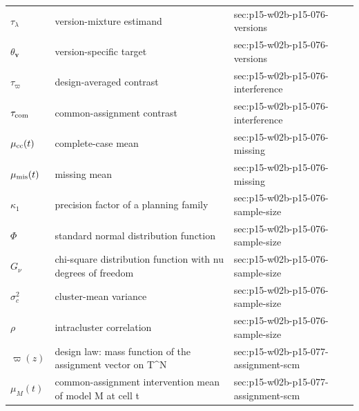 \begin{longtable}{@{}p{}p{}p{}@{}}
\(\tau_\lambda\) & version-mixture estimand & sec:\allowbreak{}p15-\allowbreak{}w02b-\allowbreak{}p15-\allowbreak{}076-\allowbreak{}versions \\
\(\theta_{\mathbf v}\) & version-specific target & sec:\allowbreak{}p15-\allowbreak{}w02b-\allowbreak{}p15-\allowbreak{}076-\allowbreak{}versions \\
\(\tau_\varpi\) & design-averaged contrast & sec:\allowbreak{}p15-\allowbreak{}w02b-\allowbreak{}p15-\allowbreak{}076-\allowbreak{}interference \\
\(\tau_{\rm com}\) & common-assignment contrast & sec:\allowbreak{}p15-\allowbreak{}w02b-\allowbreak{}p15-\allowbreak{}076-\allowbreak{}interference \\
\(\mu_{\rm cc}(t)\) & complete-case mean & sec:\allowbreak{}p15-\allowbreak{}w02b-\allowbreak{}p15-\allowbreak{}076-\allowbreak{}missing \\
\(\mu_{\rm mis}(t)\) & missing mean & sec:\allowbreak{}p15-\allowbreak{}w02b-\allowbreak{}p15-\allowbreak{}076-\allowbreak{}missing \\
\(\kappa_1\) & precision factor of a planning family & sec:\allowbreak{}p15-\allowbreak{}w02b-\allowbreak{}p15-\allowbreak{}076-\allowbreak{}sample-\allowbreak{}size \\
\(\Phi\) & standard normal distribution function & sec:\allowbreak{}p15-\allowbreak{}w02b-\allowbreak{}p15-\allowbreak{}076-\allowbreak{}sample-\allowbreak{}size \\
\(G_\nu\) & chi-square distribution function with nu degrees of freedom & sec:\allowbreak{}p15-\allowbreak{}w02b-\allowbreak{}p15-\allowbreak{}076-\allowbreak{}sample-\allowbreak{}size \\
\(\sigma_c^2\) & cluster-mean variance & sec:\allowbreak{}p15-\allowbreak{}w02b-\allowbreak{}p15-\allowbreak{}076-\allowbreak{}sample-\allowbreak{}size \\
\(\rho\) & intracluster correlation & sec:\allowbreak{}p15-\allowbreak{}w02b-\allowbreak{}p15-\allowbreak{}076-\allowbreak{}sample-\allowbreak{}size \\
\(\varpi(z)\) & design law: mass function of the assignment vector on T\^{}N & sec:\allowbreak{}p15-\allowbreak{}w02b-\allowbreak{}p15-\allowbreak{}077-\allowbreak{}assignment-\allowbreak{}scm \\
\(\mu_M(t)\) & common-assignment intervention mean of model M at cell t & sec:\allowbreak{}p15-\allowbreak{}w02b-\allowbreak{}p15-\allowbreak{}077-\allowbreak{}assignment-\allowbreak{}scm \\

\end{longtable}
